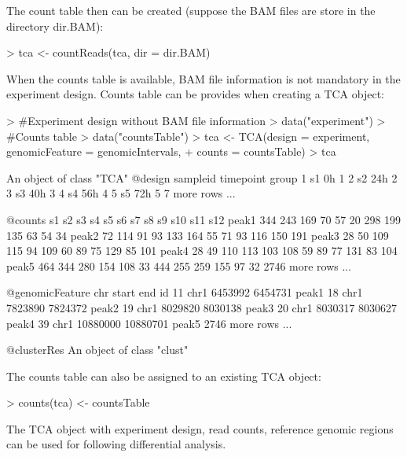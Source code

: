 \documentclass[a4paper]{article}
\begin{document}
The count table then can be created (suppose the BAM files are store in the directory dir.BAM):
\begin{Schunk}
\begin{Sinput}
> tca <- countReads(tca, dir = dir.BAM)
\end{Sinput}
\end{Schunk}
When the counts table is available, BAM file information is not mandatory in the experiment design. Counts table can be provides when creating a TCA object:
\begin{Schunk}
\begin{Sinput}
> #Experiment design without BAM file information
> data("experiment")
> #Counts table
> data("countsTable")
> tca <- TCA(design = experiment, genomicFeature = genomicIntervals,
+            counts = countsTable)
> tca
\end{Sinput}
\begin{Soutput}
An object of class "TCA"
@design
  sampleid timepoint group
1       s1        0h     1
2       s2       24h     2
3       s3       40h     3
4       s4       56h     4
5       s5       72h     5
7 more rows ...

@counts
       s1  s2  s3  s4  s5  s6  s7  s8  s9 s10 s11 s12
peak1 344 243 169  70  57  20 298 199 135  63  54  34
peak2  72 114  91  93 133 164  55  71  93 116 150 191
peak3  28  50 109 115  94 109  60  89  75 129  85 101
peak4  28  49 110 113 103 108  59  89  77 131  83 104
peak5 464 344 280 154 108  33 444 255 259 155  97  32
2746 more rows ...

@genomicFeature
    chr    start      end    id
11 chr1  6453992  6454731 peak1
18 chr1  7823890  7824372 peak2
19 chr1  8029820  8030138 peak3
20 chr1  8030317  8030627 peak4
39 chr1 10880000 10880701 peak5
2746 more rows ...

@clusterRes
An object of class "clust"
\end{Soutput}
\end{Schunk}
The counts table can also be assigned to an existing TCA object:
\begin{Schunk}
\begin{Sinput}
> counts(tca) <- countsTable
\end{Sinput}
\end{Schunk}
The TCA object with experiment design, read counts, reference genomic regions can be used for following differential analysis.
\end{document}
